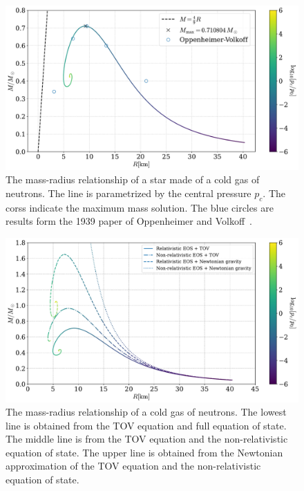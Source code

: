 \begin{figure}[!h]
    \centering
    \includegraphics[width=\textwidth]{../scripts/figurer/mass_radius_neutron.pdf}
    \caption{The mass-radius relationship of a star made of a cold gas of neutrons. The line is parametrized by the central pressure $p_c$. The corss indicate the maximum mass solution. The blue circles are results form the 1939 paper of Oppenheimer and Volkoff~\autocite{oppenheimerMassiveNeutronCores1939}.}
    \label{fig: mass radius relationship fermi gas}
\end{figure}

\begin{figure}[!h]
    \centering
    \includegraphics[width=\textwidth]{../scripts/figurer/mass_radius_comparison.pdf}
    \caption{The mass-radius relationship of a cold gas of neutrons. The lowest line is obtained from the TOV equation and full equation of state. The middle line is from the TOV equation and the non-relativistic equation of state. The upper line is obtained from the Newtonian approximation of the TOV equation and the non-relativistic equation of state.}
    \label{fig: mass radius relationship comparison}
\end{figure}

